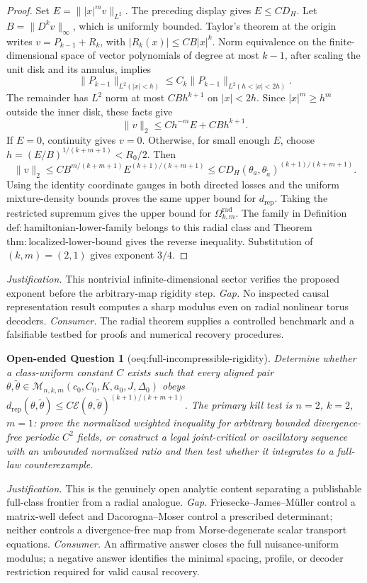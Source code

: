 \documentclass{article}
\newtheorem{openendedquestion}{Open-ended Question}
\begin{document}
\begin{proof}
Set \(E=\||x|^mv\|_{L^2}\). The preceding display gives \(E\le C D_H\). Let \(B=\|D^kv\|_\infty\), which is uniformly bounded. Taylor's theorem at the origin writes \(v=P_{k-1}+R_k\), with \(|R_k(x)|\le CB|x|^k\). Norm equivalence on the finite-dimensional space of vector polynomials of degree at most \(k-1\), after scaling the unit disk and its annulus, implies
\[
\|P_{k-1}\|_{L^2(|x|<h)}
\le C_k\|P_{k-1}\|_{L^2(h<|x|<2h)}.
\]
The remainder has \(L^2\) norm at most \(CBh^{k+1}\) on \(|x|<2h\). Since \(|x|^m\ge h^m\) outside the inner disk, these facts give
\[
\|v\|_2\le Ch^{-m}E+CBh^{k+1}.
\]
If \(E=0\), continuity gives \(v=0\). Otherwise, for small enough \(E\), choose
\(h=(E/B)^{1/(k+m+1)}<R_0/2\). Then
\[
\|v\|_2
\le C B^{m/(k+m+1)}E^{(k+1)/(k+m+1)}
\le C D_H(\theta_a,\theta_{\widetilde a})^{(k+1)/(k+m+1)}.
\]
Using the identity coordinate gauges in both directed losses and the uniform mixture-density bounds proves the same upper bound for \(d_{\mathrm{rep}}\). Taking the restricted supremum gives the upper bound for \(\Omega_{k,m}^{\mathrm{rad}}\). The family in Definition \(\mathrm{def:hamiltonian\text{-}lower\text{-}family}\) belongs to this radial class and Theorem \(\mathrm{thm:localized\text{-}lower\text{-}bound}\) gives the reverse inequality. Substitution of \((k,m)=(2,1)\) gives exponent \(3/4\).
\end{proof}
\par\smallskip\noindent \textit{Justification.} This nontrivial infinite-dimensional sector verifies the proposed exponent before the arbitrary-map rigidity step. \textit{Gap.} No inspected causal representation result computes a sharp modulus even on radial nonlinear torus decoders. \textit{Consumer.} The radial theorem supplies a controlled benchmark and a falsifiable testbed for proofs and numerical recovery procedures.

\begin{openendedquestion}[oeq:full-incompressible-rigidity]\label{oeq:full-incompressible-rigidity}
Determine whether a class-uniform constant \(C\) exists such that every aligned pair \(\theta,\widetilde\theta\in\mathcal M_{n,k,m}(c_0,C_0,K,a_0,J,\Delta_0)\) obeys \(d_{\mathrm{rep}}(\theta,\widetilde\theta)\le C\mathcal E(\theta,\widetilde\theta)^{(k+1)/(k+m+1)}\). The primary kill test is \(n=2\), \(k=2\), \(m=1\): prove the normalized weighted inequality for arbitrary bounded divergence-free periodic \(C^2\) fields, or construct a legal joint-critical or oscillatory sequence with an unbounded normalized ratio and then test whether it integrates to a full-law counterexample.
\end{openendedquestion}
\par\smallskip\noindent \textit{Justification.} This is the genuinely open analytic content separating a publishable full-class frontier from a radial analogue. \textit{Gap.} Friesecke--James--Müller control a matrix-well defect and Dacorogna--Moser control a prescribed determinant; neither controls a divergence-free map from Morse-degenerate scalar transport equations. \textit{Consumer.} An affirmative answer closes the full nuisance-uniform modulus; a negative answer identifies the minimal spacing, profile, or decoder restriction required for valid causal recovery.
\end{document}
